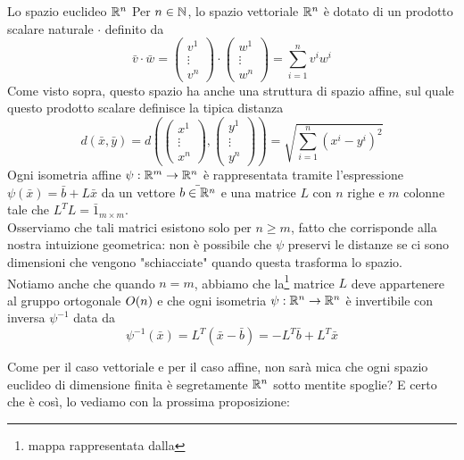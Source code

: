 \documentclass[openany]{book}
\begin{document}
\renewcommand\O{\operatorname{O}}
\newcommand\SO{\operatorname{SO}}
\begin{example}{Lo spazio euclideo $\mathbb{R}^n$}{}
    Per $n \in \mathbb{N}$, lo spazio vettoriale $\mathbb{R}^n$ è dotato di un prodotto scalare naturale $\cdot$ definito da
    \[ \bar{v}\cdot\bar{w} = \begin{pmatrix} v^1\\\vdots\\v^n \end{pmatrix}\cdot \begin{pmatrix} w^1\\\vdots\\w^n \end{pmatrix} = \sum_{i=1}^n v^i w^i \]
    Come visto sopra, questo spazio ha anche una struttura di spazio affine, sul quale questo prodotto scalare definisce la tipica distanza 
    \[ d(\bar{x},\bar{y}) = d\left(\begin{pmatrix} x^1\\\vdots\\x^n \end{pmatrix}, \begin{pmatrix} y^1\\\vdots\\y^n \end{pmatrix}\right) = \sqrt{ \sum_{i=1}^n (x^i-y^i)^2 } \]
    Ogni isometria affine $\psi : \mathbb{R}^m\to\mathbb{R}^n$ è rappresentata tramite l'espressione $\psi(\bar{x}) = \bar{b}+L\bar{x}$ da un vettore $\bar{b\in\mathbb{R}^n}$ e una matrice $L$ con $n$ righe e $m$ colonne tale che $L^T L = \bar{1}_{m\times m}$.\\
    Osserviamo che tali matrici esistono solo per $n\ge m$, fatto che corrisponde alla nostra intuizione geometrica: non è possibile che $\psi$ preservi le distanze se ci sono dimensioni che vengono "schiacciate" quando questa trasforma lo spazio.\\
    Notiamo anche che quando $n=m$, abbiamo che la\footnote{mappa rappresentata dalla} matrice $L$ deve appartenere al gruppo ortogonale $\\O(n)$ e che ogni isometria $\psi:\mathbb{R}^n\to\mathbb{R}^n$ è invertibile con inversa $\psi^{-1}$ data da 
    \[ \psi^{-1}(\bar{x}) = L^T(\bar{x}-\bar{b}) = -L^T\bar{b} + L^T\bar{x} \]
\end{example}

Come per il caso vettoriale e per il caso affine, non sarà mica che ogni spazio euclideo di dimensione finita è segretamente $\mathbb{R}^n$ sotto mentite spoglie? E certo che è così, lo vediamo con la prossima proposizione:
\end{document}
